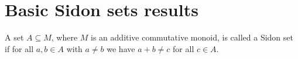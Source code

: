 %

\section{Basic Sidon sets results}

\begin{definition}\leanok
    A set $A \subseteq M$, where $M$ is an additive commutative monoid, is called a Sidon set if for all $a, b \in A$ with $a \neq b$ we have $a + b \neq c$ for all $c \in A$.
\end{definition}